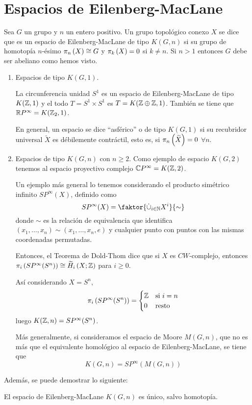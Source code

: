 \section{Espacios de Eilenberg-MacLane}
Sea $G$ un grupo y $n$ un entero positivo. Un grupo topológico conexo $X$ se dice que es un espacio de Eilenberg-MacLane de tipo $K(G,n)$ si su grupo de homotopía $n$-ésimo $\pi_{n}\left(X\right) \cong G$ y $\pi_{k}\left(X\right) = 0$ si $k \neq n$. Si $n > 1$ entonces $G$ debe ser abeliano como hemos visto.

\begin{ejems}
\begin{enumerate}
\item Espacios de tipo $K(G, 1)$. \par
La circunferencia unidad $S^1$ es un espacio de Eilenberg-MacLane de tipo $K(\mathbb{Z}, 1)$ y el todo $T = S^1 \times S^1$ es $T = K(\mathbb{Z} \oplus \mathbb{Z}, 1)$. También se tiene que $\mathbb{R}P^\infty = K(\mathbb{Z}_2, 1)$. \par
En general, un espacio se dice ``asférico'' o de tipo $K(G,1)$ si su recubridor universal $\widetilde{X}$ es débilemente contráctil, esto es, si $\pi_{n}\left(\widetilde{X}\right) = 0$ $\forall n$.

\item Espacios de tipo $K(G, n)$ con $n \geq 2$.
Como ejemplo de espacio $K(G, 2)$ tenemos al espacio proyectivo complejo $\mathbb{C}P^\infty = K(\mathbb{Z}, 2)$. \par
Un ejemplo más general lo tenemos considerando el producto simétrico infinito $SP^\infty (X)$, definido como 
\[
SP^\infty (X) = \faktor{\dot{\cup}_{i \in \bb{N}} X^i}{\sim}
\]
donde $\sim$ es la relación de equivalencia que identifica $(x_1, \ldots, x_n) \sim (x_1, \ldots, x_n, e)$ y cualquier punto con puntos con las mismas coordenadas permutadas. \par
Entonces, el Teorema de Dold-Thom dice que si $X$ es $CW$-complejo, entonces $\pi_{i}\left(SP^\infty (S^n)\right) \cong \widetilde{H}_{i}\left(X; \mathbb{Z}\right)$ para $i \geq 0$. \par
Así considerando $X = S^n$, 
\[
\pi_{i}\left(SP^\infty (S^n)\right) = 
\begin{cases}
\mathbb{Z} & \text{si } i = n \\
0 & \text{resto}
\end{cases}
\]
luego $K(\mathbb{Z},n) = SP^\infty (S^n)$. \par
Más generalmente, si consideramos el espacio de Moore $M(G, n)$, que no es más que el equivalente homológico al espacio de Eilenberg-MacLane, se tiene que 
\[
K(G, n) = SP^\infty (M(G, n))
\]
\end{enumerate}
\end{ejems}
Además, se puede demostrar lo siguiente:
\begin{teor}
El espacio de Eilenberg-MacLane $K(G, n)$ es único, salvo homotopía.
\end{teor}
